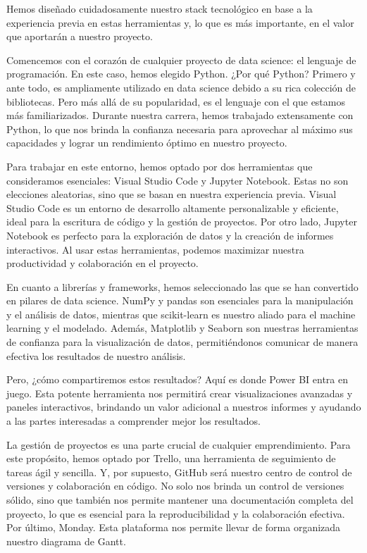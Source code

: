 \documentclass{other/docTemplate}
\begin{document}
Hemos diseñado cuidadosamente nuestro stack tecnológico en base a la experiencia previa en estas herramientas y, lo que es más importante, en el valor que aportarán a nuestro proyecto.

Comencemos con el corazón de cualquier proyecto de data science: el lenguaje de programación. En este caso, hemos elegido Python. ¿Por qué Python? Primero y ante todo, es ampliamente utilizado en data science debido a su rica colección de bibliotecas. Pero más allá de su popularidad, es el lenguaje con el que estamos más familiarizados. Durante nuestra carrera, hemos trabajado extensamente con Python, lo que nos brinda la confianza necesaria para aprovechar al máximo sus capacidades y lograr un rendimiento óptimo en nuestro proyecto.

Para trabajar en este entorno, hemos optado por dos herramientas que consideramos esenciales: Visual Studio Code y Jupyter Notebook. Estas no son elecciones aleatorias, sino que se basan en nuestra experiencia previa. Visual Studio Code es un entorno de desarrollo altamente personalizable y eficiente, ideal para la escritura de código y la gestión de proyectos. Por otro lado, Jupyter Notebook es perfecto para la exploración de datos y la creación de informes interactivos. Al usar estas herramientas, podemos maximizar nuestra productividad y colaboración en el proyecto.

En cuanto a librerías y frameworks, hemos seleccionado las que se han convertido en pilares de data science. NumPy y pandas son esenciales para la manipulación y el análisis de datos, mientras que scikit-learn es nuestro aliado para el machine learning y el modelado. Además, Matplotlib y Seaborn son nuestras herramientas de confianza para la visualización de datos, permitiéndonos comunicar de manera efectiva los resultados de nuestro análisis.

Pero, ¿cómo compartiremos estos resultados? Aquí es donde Power BI entra en juego. Esta potente herramienta nos permitirá crear visualizaciones avanzadas y paneles interactivos, brindando un valor adicional a nuestros informes y ayudando a las partes interesadas a comprender mejor los resultados.

La gestión de proyectos es una parte crucial de cualquier emprendimiento. Para este propósito, hemos optado por Trello, una herramienta de seguimiento de tareas ágil y sencilla. Y, por supuesto, GitHub será nuestro centro de control de versiones y colaboración en código. No solo nos brinda un control de versiones sólido, sino que también nos permite mantener una documentación completa del proyecto, lo que es esencial para la reproducibilidad y la colaboración efectiva. Por último, Monday. Esta plataforma nos permite llevar de forma organizada nuestro diagrama de Gantt. 
\end{document}
